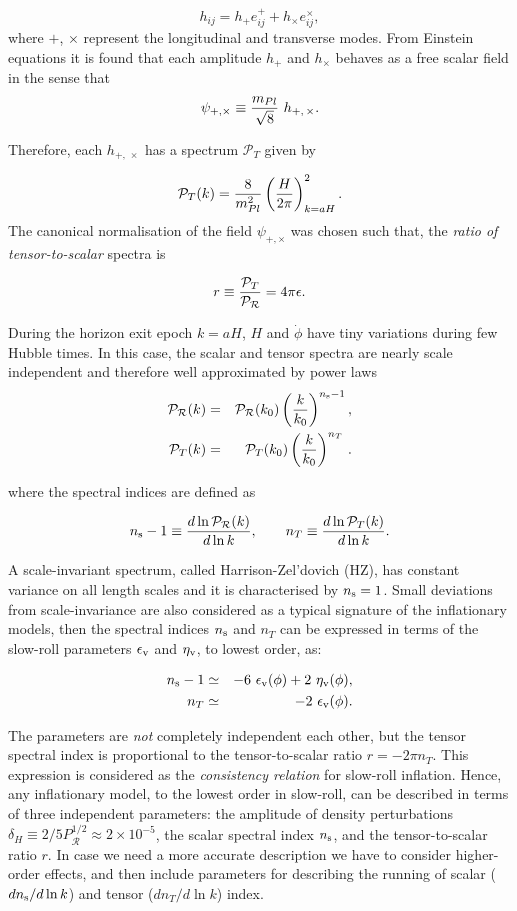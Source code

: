 \documentclass{rmaa}
\def\beq{\begin{equation}}
\def\eeq{\end{equation}}
\def\bea{\begin{eqnarray}}
\def\eea{\end{eqnarray}}
\def\cal{\mathcal}
\begin{document}
\beq
h_{ij}= h_{+}\mathit{e}^{+}_{ij}+h_{\times}\mathit{e}^{\times}_{ij},
\eeq
%
where $+$, $\times$ represent the longitudinal and transverse modes.
From Einstein equations it is found that each amplitude $h_{+}$ and $h_{\times}$
behaves as a free scalar field in the sense that
\beq
\psi_{+,\times}\equiv {m_{Pl} \over \sqrt 8}\,\,h_{+,\, \times}.
\eeq 

\noindent
Therefore, each $h_{+,\, \times}$ has a spectrum $\cal P_T$ given by

\beq
\cal P_{T}(k)={8 \over m_{Pl}^2} \left({H \over 2\pi} \right)_{k=aH}^2.
\eeq
%
The canonical normalisation of the field $\psi_{+,\times}$ was chosen such that,
the \textit{ratio of tensor-to-scalar} spectra is  

\begin{equation}
r \equiv {\cal P_{T} \over \cal P_{\cal R}} =4 \pi \epsilon .
\end{equation}

During the horizon exit epoch $k=aH$, $H$ and $\dot \phi$ have
tiny variations during few Hubble times. In this case, the scalar and tensor 
spectra are nearly scale independent and therefore well approximated by power laws 
%
\bea
\cal P_\cal R(k)  &=&\cal P_\cal R(k_0) \left( \frac{k}{k_0} \right)^{n_{\rm s}-1}, \nonumber \\
\cal P_T(k)  &=& \cal P_T(k_0) \left( \frac{k}{k_0} \right)^{n_T} \, .
\eea

\noindent
where the spectral indices are defined as \citep{Lidsey}

\beq
n_{\rm s}-1\equiv {d\ln \cal P_\cal R(k) \over d\ln k},\qquad
n_T \equiv {d\ln \cal P_T(k) \over d\ln k}. 
\eeq

\noindent
A scale-invariant spectrum, called Harrison-Zel'dovich (HZ), has constant variance
on all length scales and it is characterised by $n_{\rm s}= 1$.
 Small deviations from scale-invariance are also considered as a typical signature of the
inflationary models, then 
 the spectral indices $n_{\rm s}$ and $n_{T}$ can be expressed 
 in terms of the slow-roll parameters $\epsilon_{\rm v}$ and $\eta_{\rm v}$, to lowest order, as:

\bea \label{indices}
n_{\rm s} - 1  &\simeq&  - 6~ \epsilon_{\rm v}(\phi) + 2~ \eta_{\rm v}(\phi), \nonumber \\
n_T  &\simeq&  -2~ \epsilon_{\rm v}(\phi). 
\eea

\noindent
The parameters are {\em not} completely independent each other,  but the tensor spectral 
index is proportional to the tensor-to-scalar ratio
$r = -2 \pi n_{T}  $.  This expression is considered as the \textit{consistency
relation} for slow-roll inflation.  
Hence, any inflationary model, to the lowest order in slow-roll, 
can be described in terms of three independent parameters:
 the amplitude of density perturbations
 $\delta_H\equiv 2/5P_\cal R^{1/2} \approx 2 \times 10^{-5}$, the scalar spectral index $n_{\rm s}$,
and the tensor-to-scalar ratio $r$.
In case we need a more accurate description we have to consider higher-order effects, 
and then include parameters for describing the running of scalar ($d n_{\rm s} / d\ln{k}$)
and tensor ($d n_T / d\ln{k}$) index. 
\\
\end{document}
